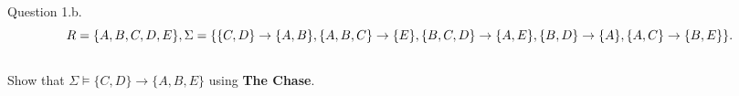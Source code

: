 \documentclass{beamer}
\begin{document}
\begin{frame}{Question 1.b.}
\scriptsize
\[
R=\{A,B,C,D,E\},\\
\Sigma=\{\{C, D\} \to \{A,B\},\{A,B,C\} \to \{E\},\{B,C,D\} \to \{A,E\},\{B,D\} \to \{A\},\{A,C\} \to \{B,E\}\}.
\]\\
Show that $\Sigma \vDash \{C,D\} \to \{A,B,E\}$ using \textbf{The Chase}.

\pause
\footnotesize
\begin{columns}
    \begin{table}
    \centering
    \caption*{\tiny Setup}
    \label{tab:setup}
\end{table}
\pause
{}
    \begin{table}
    \centering
    \caption*{\tiny Initialization}
    \label{tab:initialization}
\end{table}
\pause
{}
    \begin{table}
    \centering

\end{table}
\end{columns}
\end{frame}
\end{document}
